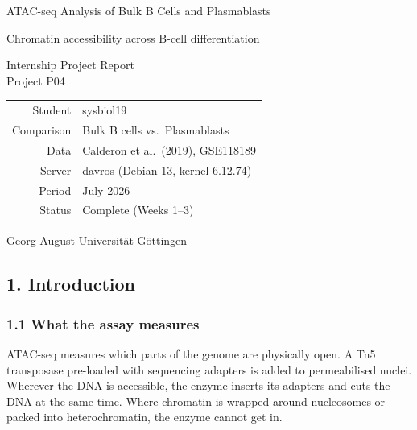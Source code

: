 \documentclass[
  11pt,
  a4paper,
]{article}
\author{}
\date{}
\begin{document}
\begin{titlepage}
\centering
\vspace*{4cm}

{\LARGE ATAC-seq Analysis of Bulk B Cells and Plasmablasts\par}

\vspace{1cm}
{\large Chromatin accessibility across B-cell differentiation\par}

\vspace{3cm}
Internship Project Report\\
Project P04

\vspace{3cm}
\begin{tabular}{@{}rl@{}}
Student    & sysbiol19 \\
Comparison & Bulk B cells vs.\ Plasmablasts \\
Data       & Calderon et al.\ (2019), GSE118189 \\
Server     & davros (Debian 13, kernel 6.12.74) \\
Period     & July 2026 \\
Status     & Complete (Weeks 1--3) \\
\end{tabular}

\vfill
Georg-August-Universität Göttingen
\vspace{1cm}
\end{titlepage}

\tableofcontents
\clearpage

\hypertarget{introduction}{%
\subsection{1. Introduction}\label{introduction}}

\hypertarget{what-the-assay-measures}{%
\subsubsection{1.1 What the assay
measures}\label{what-the-assay-measures}}

ATAC-seq measures which parts of the genome are physically open. A Tn5
transposase pre-loaded with sequencing adapters is added to
permeabilised nuclei. Wherever the DNA is accessible, the enzyme inserts
its adapters and cuts the DNA at the same time. Where chromatin is
wrapped around nucleosomes or packed into heterochromatin, the enzyme
cannot get in.
\end{document}
